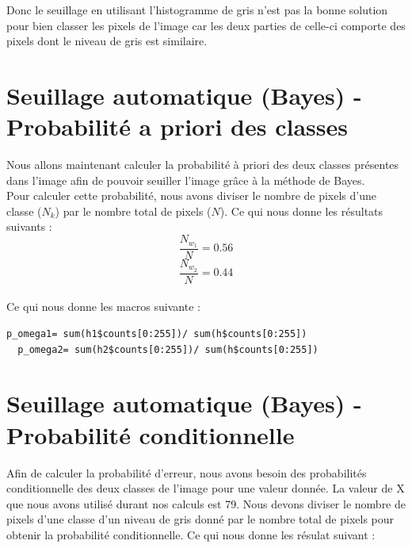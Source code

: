 \documentclass[a4paper,11pt]{article}
\begin{document}
  
  Donc le seuillage en utilisant l'histogramme de gris n'est pas la bonne solution pour 
  bien classer les pixels de l'image car les deux parties de celle-ci comporte des pixels
  dont le niveau de gris est similaire.
  
  \section{Seuillage automatique (Bayes) - Probabilité a priori des classes}
  Nous allons maintenant calculer la probabilité à priori des deux classes présentes dans l'image
  afin de pouvoir seuiller l'image grâce à la méthode de Bayes.\\
  
  Pour calculer cette probabilité, nous avons diviser le nombre de pixels d'une classe ($N_k$) par
  le nombre total de pixels ($N$). Ce qui nous donne les résultats suivants :
  $$\frac{N_{w_1}}{N} = 0.56$$
  $$\frac{N_{w_2}}{N} = 0.44$$\\
  
  Ce qui nous donne les macros suivante :\\
  
  \begin{lstlisting}[caption=Macros de calcule de probabilité à priori des classe $N_{w_1}$ et $N_{w_2}$]
  p_omega1= sum(h1$counts[0:255])/ sum(h$counts[0:255])
  p_omega2= sum(h2$counts[0:255])/ sum(h$counts[0:255])
  \end{lstlisting}
  
  \section{Seuillage automatique (Bayes) - Probabilité conditionnelle}
  Afin de calculer la probabilité d'erreur, nous avons besoin des probabilités conditionnelle des deux
  classes de l'image pour une valeur donnée. La valeur de X que nous avons utilisé durant nos calculs
  est 79. Nous devons diviser le nombre de pixels d'une classe d'un niveau de gris donné par le nombre total de
  pixels pour obtenir la probabilité conditionnelle. Ce qui nous donne les résulat suivant :
  
\end{document}
